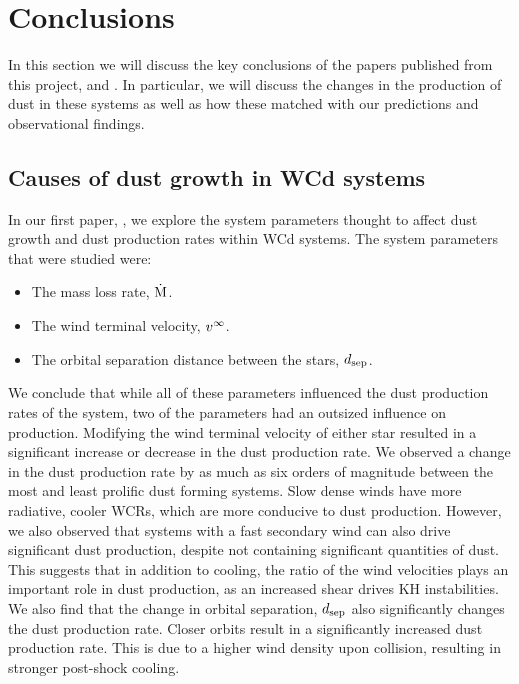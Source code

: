\section{Conclusions}

In this section we will discuss the key conclusions of the papers published from this project, \emph{\firstpapertitle{}} \parencite{eatsonExplorationDustGrain2022} and \emph{\secondpapertitle}.
In particular, we will discuss the changes in the production of dust in these systems as well as how these matched with our predictions and observational findings.

\subsection{Causes of dust growth in WCd systems}

In our first paper, \emph{\firstpapertitle} \parencite{eatsonExplorationDustGrain2022}, we explore the system parameters thought to affect dust growth and dust production rates within WCd systems.
The system parameters that were studied were:

\begin{itemize}
  \item The mass loss rate, $\dot{\text{M}}$.
  \item The wind terminal velocity, $v^\infty$.
  \item The orbital separation distance between the stars, $d_\text{sep}$.
\end{itemize}

\noindent
We conclude that while all of these parameters influenced the dust production rates of the system, two of the parameters had an outsized influence on production.
Modifying the wind terminal velocity of either star resulted in a significant increase or decrease in the dust production rate.
We observed a change in the dust production rate by as much as six orders of magnitude between the most and least prolific dust forming systems.
Slow dense winds have more radiative, cooler WCRs, which are more conducive to dust production.
However, we also observed that systems with a fast secondary wind can also drive significant dust production, despite not containing significant quantities of dust.
This suggests that in addition to cooling, the ratio of the wind velocities plays an important role in dust production, as an increased shear drives KH instabilities.
We also find that the change in orbital separation, $d_\text{sep}$ also significantly changes the dust production rate.
Closer orbits result in a significantly increased dust production rate.
This is due to a higher wind density upon collision, resulting in stronger post-shock cooling.

